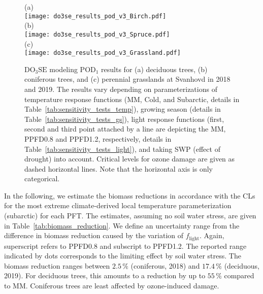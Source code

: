 \documentclass[bg, manuscript]{copernicus}
\begin{document}
\begin{figure}[t]
  \centering
  (a)\\
  \texttt{[image: do3se\_results\_pod\_v3\_Birch.pdf]}\\
  (b)\\
  \texttt{[image: do3se\_results\_pod\_v3\_Spruce.pdf]}\\
  (c)\\
  \texttt{[image: do3se\_results\_pod\_v3\_Grassland.pdf]}
  \caption{$\mathrm{DO_3SE}$ modeling $\mathrm{POD_1}$ results for (a) deciduous trees, (b) coniferous trees, and (c) perennial grasslands at Svanhovd in 2018 and 2019. The results vary depending on parameterizations of temperature response functions (MM, Cold, and Subarctic, details in Table~\ref{tab:sensitivity_tests_temp}), growing season (details in Table~\ref{tab:sensitivity_tests_gs}), light response functions (first, second and third point attached by a line are depicting the MM, PPFD0.8 and PPFD1.2, respectively, details in Table~\ref{tab:sensitivity_tests_light}), and taking SWP (effect of drought) into account. Critical levels for ozone damage \citep{ICP:MappingManual2017,ESPR:Hayes2021} are given as dashed horizontal lines. Note that the horizontal axis is only categorical.}
  \label{fig:pody_rel}
\end{figure}

In the following, we estimate the biomass reductions in accordance with the CLs \citep{ICP:MappingManual2017, ESPR:Hayes2021} for the most extreme climate-derived local temperature parameterization (subarctic) for each PFT. The estimates, assuming no soil water stress, are given in Table~\ref{tab:biomass_reduction}. We define an uncertainty range from the difference in biomass reduction caused by the variation of $f_\mathrm{light}$. Again, superscript refers to PPFD0.8 and subscript to PPFD1.2. The reported range indicated by dots corresponds to the limiting effect by soil water stress. The biomass reduction ranges between $2.5\,\unit{\%}$ (coniferous, 2018) and $17.4\,\unit{\%}$ (deciduous, 2019). For deciduous trees, this amounts to a reduction by up to $55\,\unit{\%}$ compared to MM. Coniferous trees are least affected by ozone-induced damage.
\end{document}
